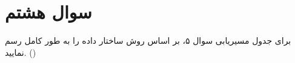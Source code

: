 \section{سوال هشتم}

برای جدول مسیریابی سوال ۵، بر اساس روش  ساختار داده را به طور کامل رسم نمایید. ()


\begin{qsolve}
	
\end{qsolve}